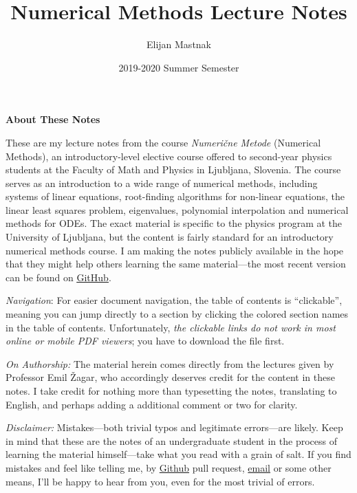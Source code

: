 \documentclass[11pt, a4paper]{article}
\begin{document}
\title{Numerical Methods Lecture Notes}
\author{Elijan Mastnak}
\date{2019-2020 Summer Semester}
\maketitle

\begin{center}
\textbf{About These Notes}
\end{center}
These are my lecture notes from the course \textit{Numeri\v{c}ne Metode} (Numerical Methods), an introductory-level elective course offered to second-year physics students at the Faculty of Math and Physics in Ljubljana, Slovenia. The course serves as an introduction to a wide range of numerical methods, including systems of linear equations, root-finding algorithms for non-linear equations, the linear least squares problem, eigenvalues, polynomial interpolation and numerical methods for ODEs. The exact material is specific to the physics program at the University of Ljubljana, but the content is fairly standard for an introductory numerical methods course. I am making the notes publicly available in the hope that they might help others learning the same material---the most recent version can be found on \href{https://github.com/ejmastnak/fmf/tree/main/intro-numerical-methods}{\underline{GitHub}}.

\vspace{2mm}
\textit{Navigation}: For easier document navigation, the table of contents is ``clickable'', meaning you can jump directly to a section by clicking the colored section names in the table of contents. Unfortunately, \textit{the clickable links do not work in most online or mobile PDF viewers}; you have to download the file first.

\vspace{2mm}
\textit{On Authorship:} The material herein comes directly from the lectures given by Professor Emil \v{Z}agar, who accordingly deserves credit for the content in these notes. I take credit for nothing more than typesetting the notes, translating to English, and perhaps adding a additional comment or two for clarity.

\vspace{2mm}
\textit{Disclaimer:} Mistakes---both trivial typos and legitimate errors---are likely. Keep in mind that these are the notes of an undergraduate student in the process of learning the material himself---take what you read with a grain of salt. If you find mistakes and feel like telling me, by \href{https://github.com/ejmastnak/fmf}{Github} pull request, \href{mailto:ejmastnak@gmail.com}{email} or some other means, I'll be happy to hear from you, even for the most trivial of errors.
\end{document}
